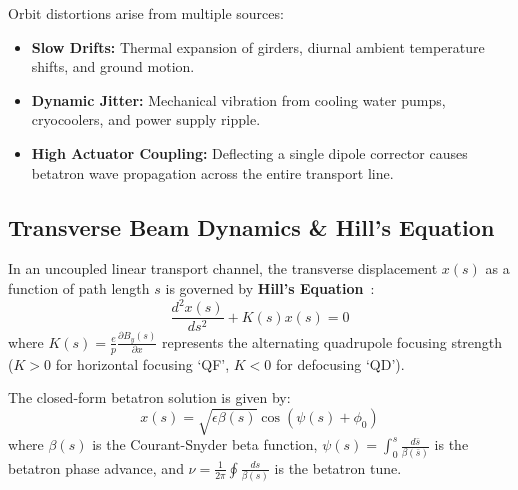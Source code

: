 \documentclass[11pt,a4paper]{article}
\begin{document}
Orbit distortions arise from multiple sources:
\begin{itemize}
    \item \textbf{Slow Drifts:} Thermal expansion of girders, diurnal ambient temperature shifts, and ground motion.
    \item \textbf{Dynamic Jitter:} Mechanical vibration from cooling water pumps, cryocoolers, and power supply ripple.
    \item \textbf{High Actuator Coupling:} Deflecting a single dipole corrector causes betatron wave propagation across the entire transport line.
\end{itemize}

\subsection{Transverse Beam Dynamics \& Hill's Equation}
In an uncoupled linear transport channel, the transverse displacement $x(s)$ as a function of path length $s$ is governed by \textbf{Hill's Equation}~\cite{wiedemann2015particle}:
\begin{equation}
    \frac{d^2 x(s)}{ds^2} + K(s) x(s) = 0
\end{equation}
where $K(s) = \frac{e}{p} \frac{\partial B_y(s)}{\partial x}$ represents the alternating quadrupole focusing strength ($K > 0$ for horizontal focusing `QF', $K < 0$ for defocusing `QD').

The closed-form betatron solution is given by:
\begin{equation}
    x(s) = \sqrt{\epsilon \beta(s)} \cos\left( \psi(s) + \phi_0 \right)
\end{equation}
where $\beta(s)$ is the Courant-Snyder beta function, $\psi(s) = \int_0^s \frac{d\bar{s}}{\beta(\bar{s})}$ is the betatron phase advance, and $\nu = \frac{1}{2\pi} \oint \frac{ds}{\beta(s)}$ is the betatron tune.
\end{document}
